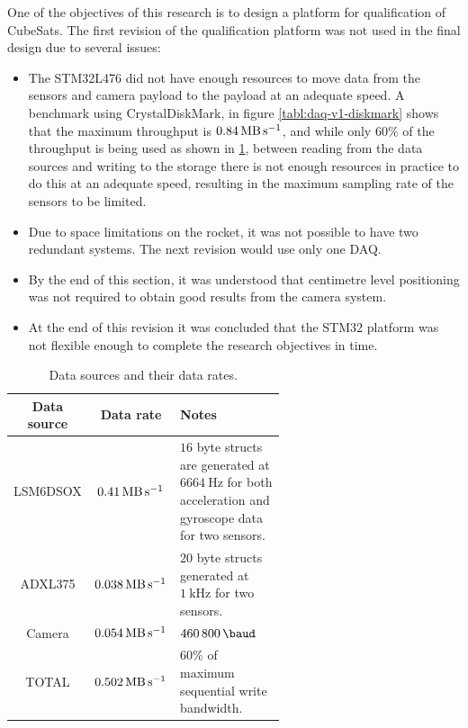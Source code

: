 \documentclass[a4paper,11pt]{article}
\begin{document}
One of the objectives of this research is to design a platform for qualification of CubeSats. The first revision of the qualification platform was not used in the final design due to several issues:

\begin{itemize}
  \item The STM32L476 did not have enough resources to move data from the sensors and camera payload to the payload at an adequate speed. A benchmark using CrystalDiskMark, in figure \ref{tabl:daq-v1-diskmark} shows that the maximum throughput is $\SI{0.84}{\mega\byte\per\second}$, and while only 60\% of the throughput is being used as shown in \ref{tabl:daq-v1-sensor-datarate}, between reading from the data sources and writing to the storage there is not enough resources in practice to do this at an adequate speed, resulting in the maximum sampling rate of the sensors to be limited.
  \item Due to space limitations on the rocket, it was not possible to have two redundant systems. The next revision would use only one DAQ.
  \item By the end of this section, it was understood that centimetre level positioning was not required to obtain good results from the camera system.
  \item At the end of this revision it was concluded that the STM32 platform was not flexible enough to complete the research objectives in time.
\end{itemize}

\begin{table}[H]
  \centering
  \label{tabl:daq-v1-sensor-datarate}
  \begin{tabular}{|c|c|p{0.6\linewidth}|}
    Data source & Data rate                           & Notes                                                                                                            \\
    \hline
    LSM6DSOX    & $\SI{0.41}{\mega\byte\per\second}$  & $16$ byte structs are generated at $\SI{6664}{\hertz}$ for both acceleration and gyroscope data for two sensors. \\
    ADXL375     & $\SI{0.038}{\mega\byte\per\second}$ & $20$ byte structs generated at $\SI{1}{\kilo\hertz}$ for two sensors.                                            \\
    Camera      & $\SI{0.054}{\mega\byte\per\second}$ & $\SI{460800}{\baud}$                                                                                             \\
    TOTAL       & $\SI{0.502}{\mega\byte\per\second}$ & $60\%$ of maximum sequential write bandwidth.
  \end{tabular}
  \caption{Data sources and their data rates.}
\end{table}
\end{document}
